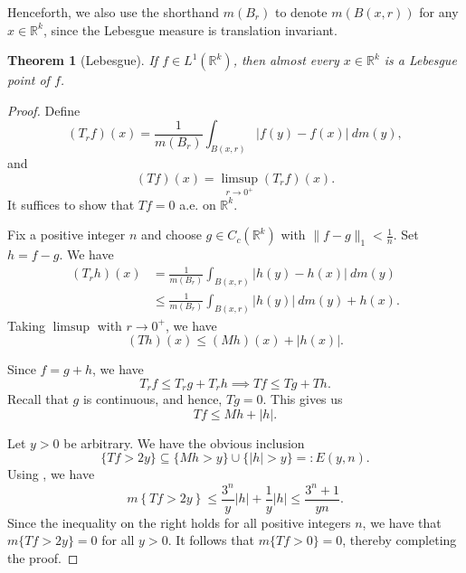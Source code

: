 \documentclass[12pt]{article}
\theoremstyle{thmstyle}
\newtheorem{theorem}{Theorem}[section]
\theoremstyle{defstyle}
\newcommand{\R}{\mathbb{R}}
\renewcommand{\le}{\leqslant}
\begin{document}
Henceforth, we also use the shorthand $m(B_r)$ to denote $m(B(x, r))$ for any $x\in\R^k$, since the Lebesgue measure is translation invariant.
\begin{theorem}[Lebesgue]
    If $f\in L^1(\R^k)$, then almost every $x\in\R^k$ is a Lebesgue point of $f$.
\end{theorem}
\begin{proof}
    Define 
    \begin{equation*}
        (T_rf)(x) = \frac{1}{m(B_r)}\int_{B(x, r)} |f(y) - f(x)|~dm(y),
    \end{equation*}
    and 
    \begin{equation*}
        (Tf)(x) = \limsup_{r\to 0^+} (T_rf)(x).
    \end{equation*}
    It suffices to show that $Tf = 0$ a.e. on $\R^k$.

    Fix a positive integer $n$ and choose $g\in C_c(\R^k)$ with $\|f - g\|_1 < \frac{1}{n}$. Set $h = f - g$. We have 
    \begin{align*}
        (T_rh)(x) &= \frac{1}{m(B_r)}\int_{B(x, r)}|h(y) - h(x)|~dm(y)\\
        &\le\frac{1}{m(B_r)}\int_{B(x, r)}|h(y)|~dm(y) + h(x).
    \end{align*}
    Taking $\limsup$ with $r\to 0^+$, we have 
    \begin{equation*}
        (Th)(x)\le (Mh)(x) + |h(x)|.
    \end{equation*}
    
    Since $f = g + h$, we have 
    \begin{equation*}
        T_rf\le T_rg + T_rh\implies Tf\le Tg + Th.
    \end{equation*}
    Recall that $g$ is continuous, and hence, $Tg = 0$. This gives us 
    \begin{equation*}
        Tf\le Mh + |h|.
    \end{equation*}

    Let $y > 0$ be arbitrary. We have the obvious inclusion
    \begin{equation*}
        \{Tf > 2y\}\subseteq\{Mh > y\}\cup\{|h| > y\} =: E(y, n).
    \end{equation*}
    Using , we have 
    \begin{equation*}
        m\left\{Tf > 2y\right\}\le\frac{3^n}{y}|h| + \frac{1}{y}|h|\le\frac{3^n + 1}{yn}.
    \end{equation*}
    Since the inequality on the right holds for all positive integers $n$, we have that $m\{Tf > 2y\} = 0$ for all $y > 0$. It follows that $m\{Tf > 0\} = 0$, thereby completing the proof.
\end{proof}
\end{document}
